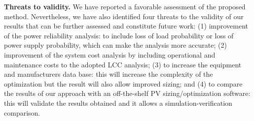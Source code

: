 \documentclass[runningheads]{llncs}
\begin{document}
\textbf{Threats to validity.}  We have reported a favorable assessment of the proposed method. Nevertheless, we have also identified four threats to the validity of our results that can be further assessed and constitute future work: (1) improvement of the power reliability analysis: to include loss of load probability or loss of power supply probability, which can make the analysis more accurate; (2) improvement of the system cost analysis by including operational and maintenance costs to the adopted LCC analysis; (3) to increase the equipment and manufacturers data base: this will increase the complexity of the optimization but the result will also allow improved sizing; and (4) to compare the results of our approach with an off-the-shelf PV sizing/optimization software: this will validate the results obtained and it allows a simulation-verification comparison.
%
%
%
%
\end{document}
